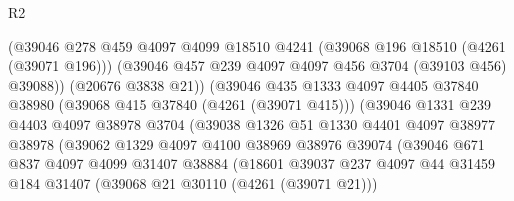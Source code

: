 \begin{lexlean}{R2}
\begin{coremodule}
                                  (@39046
                                    @278
                                    @459
                                    @4097
                                    @4099
                                    @18510
                                    @4241
                                    (@39068 @196 @18510 (@4261 (@39071 @196)))
                                    (@39046 @457 @239 @4097 @4097 @456 @3704 (@39103 @456) @39088))
                                  (@20676 @3838 @21))
                                (@39046
                                  @435
                                  @1333
                                  @4097
                                  @4405
                                  @37840
                                  @38980
                                  (@39068 @415 @37840 (@4261 (@39071 @415)))
                                  (@39046
                                    @1331
                                    @239
                                    @4403
                                    @4097
                                    @38978
                                    @3704
                                    (@39038
                                      @1326
                                      @51
                                      @1330
                                      @4401
                                      @4097
                                      @38977
                                      @38978
                                      (@39062
                                        @1329
                                        @4097
                                        @4100
                                        @38969
                                        @38976
                                        @39074
                                        (@39046
                                          @671
                                          @837
                                          @4097
                                          @4099
                                          @31407
                                          @38884
                                          (@18601
                                            @39037
                                            @237
                                            @4097
                                            @44
                                            @31459
                                            @184
                                            @31407
                                            (@39068 @21 @30110 (@4261 (@39071 @21)))

\end{coremodule}
\end{lexlean}
